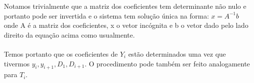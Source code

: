 Notamos trivialmente que a matriz dos coeficientes tem determinante não nulo
e portanto pode ser invertida e o sistema tem solução única na forma: $x =A^{-1}b$ 
onde A é a matriz dos coeficientes, x o vetor incógnita e b o vetor dado pelo
lado direito da equação acima como usualmente.

\paragraph{}Temos portanto que os coeficientes de $Y_i$ estão determinados
uma vez que tivermos $y_i, y_{i+1}, D_1, D_{i+1}$. O procedimento pode também 
ser feito analogamente para $T_i$.
 
